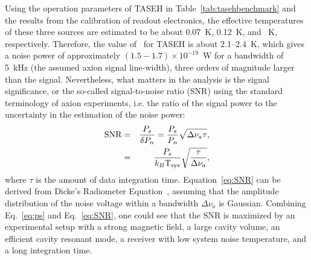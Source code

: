 Using the operation parameters of TASEH in Table~\ref{tab:tasehbenchmark} and 
the results from the calibration of readout electronics, 
the effective temperatures of these three sources are estimated to be about 
0.07~K, 0.12~K, and \noise~K, respectively.  
Therefore, the value of \tsys\ for TASEH 
is about 2.1--2.4~K, which gives a noise power of approximately 
$\left(1.5-1.7\right)\times 10^{-19}$~W 
for a bandwidth of 5~kHz (the assumed axion signal line-width), three 
orders of magnitude larger than the signal. Nevertheless, what matters in the 
analysis is the signal significance, or the so-called signal-to-noise ratio 
(SNR) using the standard terminology of axion experiments, i.e. the ratio of 
the signal power to the uncertainty in the estimation of 
the noise power:
\begin{eqnarray}
   \text{SNR} & = & \frac{P_s}{\delta P_n} = \frac{P_s}{P_n}\sqrt{\Delta\nu_a\tau}, \nonumber \\
              & = & \frac{P_s}{k_B\text{T}_\text{sys}}\sqrt{\frac{\tau}{\Delta\nu_a}},
 \label{eq:SNR}
\end{eqnarray}  
where $\tau$ is the amount of data integration time. Equation~\eqref{eq:SNR} 
can be derived from Dicke's Radiometer Equation~\cite{Dicke}, assuming that 
the amplitude distribution of the noise voltage within a bandwidth 
$\Delta\nu_a$ is Gaussian. Combining Eq.~\eqref{eq:ps} and Eq.~\eqref{eq:SNR},
one could see that the SNR is maximized by an experimental setup with 
a strong magnetic field, a large cavity volume, an efficient cavity 
resonant mode, a receiver with low system noise temperature, and a 
long integration time. 










